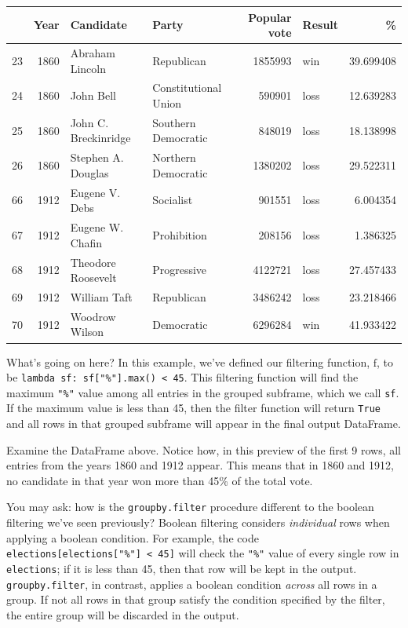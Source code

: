 \documentclass[
  letterpaper,
  DIV=11,
  numbers=noendperiod]{scrreprt}
\begin{document}
\begin{tabular}{lrllrlr}
\toprule
{} &  Year &             Candidate &                 Party &  Popular vote & Result &          \% \\
\midrule
23 &  1860 &       Abraham Lincoln &            Republican &       1855993 &    win &  39.699408 \\
24 &  1860 &             John Bell &  Constitutional Union &        590901 &   loss &  12.639283 \\
25 &  1860 &  John C. Breckinridge &   Southern Democratic &        848019 &   loss &  18.138998 \\
26 &  1860 &    Stephen A. Douglas &   Northern Democratic &       1380202 &   loss &  29.522311 \\
66 &  1912 &        Eugene V. Debs &             Socialist &        901551 &   loss &   6.004354 \\
67 &  1912 &      Eugene W. Chafin &           Prohibition &        208156 &   loss &   1.386325 \\
68 &  1912 &    Theodore Roosevelt &           Progressive &       4122721 &   loss &  27.457433 \\
69 &  1912 &          William Taft &            Republican &       3486242 &   loss &  23.218466 \\
70 &  1912 &        Woodrow Wilson &            Democratic &       6296284 &    win &  41.933422 \\
\bottomrule
\end{tabular}

What's going on here? In this example, we've defined our filtering
function, \(\text{f}\), to be
\texttt{lambda\ sf:\ sf{[}"\%"{]}.max()\ \textless{}\ 45}. This
filtering function will find the maximum \texttt{"\%"} value among all
entries in the grouped subframe, which we call \texttt{sf}. If the
maximum value is less than 45, then the filter function will return
\texttt{True} and all rows in that grouped subframe will appear in the
final output DataFrame.

Examine the DataFrame above. Notice how, in this preview of the first 9
rows, all entries from the years 1860 and 1912 appear. This means that
in 1860 and 1912, no candidate in that year won more than 45\% of the
total vote.

You may ask: how is the \texttt{groupby.filter} procedure different to
the boolean filtering we've seen previously? Boolean filtering considers
\emph{individual} rows when applying a boolean condition. For example,
the code \texttt{elections{[}elections{[}"\%"{]}\ \textless{}\ 45{]}}
will check the \texttt{"\%"} value of every single row in
\texttt{elections}; if it is less than 45, then that row will be kept in
the output. \texttt{groupby.filter}, in contrast, applies a boolean
condition \emph{across} all rows in a group. If not all rows in that
group satisfy the condition specified by the filter, the entire group
will be discarded in the output.
\end{document}
